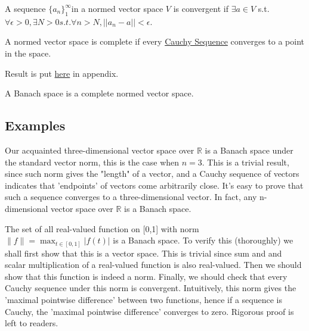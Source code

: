 \documentclass{article}
\begin{document}
\begin{definition}[Convergence]\rm\nextline
	A sequence $\{a_n\}_1^\infty$in a normed vector space $V$ is convergent if
	$\exists a\in V$ s.t.
	$\forall \epsilon>0, \exists N>0 s.t. \forall n>N, ||a_n-a||<\epsilon$.

\end{definition}

\begin{definition}[Completeness]\rm\nextline
	A normed vector space is complete if every \href{Cauchy Sequence}{Cauchy Sequence} converges to a point in the space.

\end{definition}

\begin{theorem}\rm\nextline
	Result is put \hyperref[completion of metric space]{\color {red} here} in appendix.
\end{theorem}
\begin{definition}\rm\nextline
	A Banach space is a complete normed vector space.
\end{definition}





\subsection{Examples}
\begin{example}[$\mathbb{R}^n$]\rm\nextline
	Our acquainted three-dimensional vector space over $\mathbb{R}$  is a Banach space under the standard vector norm, this is the case when $n=3$. This is a trivial result, since such norm gives the "length" of a vector, and a Cauchy sequence of vectors indicates that 'endpoints' of vectors come arbitrarily close. It's easy to prove that such a sequence converges to a three-dimensional vector. In fact, any n-dimensional  vector space over $\mathbb R$ is a Banach space.
\end{example}

\begin{example}\rm\nextline
	The set of all real-valued function on [0,1] with norm $\|f\|=\max_{t \in [0,1]} |f(t)|$
	is a Banach space. To verify this (thoroughly) we shall first show that this is a vector space. This is trivial since sum and and scalar multiplication of a real-valued function is also real-valued. Then we should show that this function is indeed a norm. Finally, we should check that every Cauchy sequence under this norm is convergent. Intuitively, this norm gives the 'maximal pointwise difference' between two functions, hence if a sequence is Cauchy, the 'maximal pointwise difference' converges to zero. Rigorous proof is left to readers.
\end{example}
\end{document}
